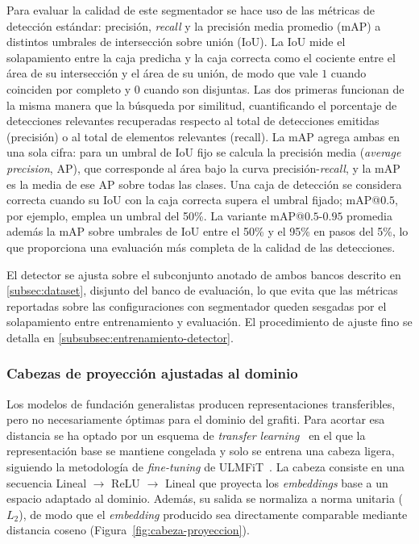 Para evaluar la calidad de este segmentador se hace uso de las métricas de
detección estándar: precisión, \textit{recall} y la precisión media promedio
(mAP) a distintos umbrales de intersección sobre unión (IoU). La IoU mide el
solapamiento entre la caja predicha y la caja correcta como el cociente entre
el área de su intersección y el área de su unión, de modo que vale $1$ cuando
coinciden por completo y $0$ cuando son disjuntas. Las dos primeras funcionan
de la misma manera que la búsqueda por similitud, cuantificando el porcentaje
de detecciones relevantes recuperadas respecto al total de detecciones emitidas
(precisión) o al total de elementos relevantes (recall). La mAP agrega ambas en
una sola cifra: para un umbral de IoU fijo se calcula la precisión media
(\textit{average precision}, AP), que corresponde al área bajo la curva
precisión-\textit{recall}, y la mAP es la media de ese AP sobre todas las
clases. Una caja de detección se considera correcta cuando su IoU con la caja
correcta supera el umbral fijado; mAP@$0.5$, por ejemplo, emplea un umbral del
50\%. La variante mAP@$0.5$-$0.95$ promedia además la mAP sobre umbrales de IoU
entre el 50\% y el 95\% en pasos del 5\%, lo que proporciona una evaluación más
completa de la calidad de las detecciones.

El detector se ajusta sobre el subconjunto anotado de ambos bancos descrito en
\ref{subsec:dataset}, disjunto del banco de evaluación, lo que evita que las
métricas reportadas sobre las configuraciones con segmentador queden sesgadas
por el solapamiento entre entrenamiento y evaluación. El procedimiento de ajuste
fino se detalla en \ref{subsubsec:entrenamiento-detector}.

\subsubsection{Cabezas de proyección ajustadas al dominio}
\label{subsubsec:cabezas}
Los modelos de fundación generalistas producen representaciones transferibles,
pero no necesariamente óptimas para el dominio del grafiti. Para acortar esa
distancia se ha optado por un esquema de \textit{transfer
learning}~\cite{pan_survey_2010} en el que la representación base se mantiene
congelada y solo se entrena una cabeza ligera, siguiendo la metodología de
\textit{fine-tuning} de ULMFiT~\cite{howard_universal_2018}. La cabeza consiste
en una secuencia Lineal $\rightarrow$ ReLU $\rightarrow$ Lineal que proyecta
los \textit{embeddings} base a un espacio adaptado al dominio. Además, su
salida se normaliza a norma unitaria ($L_2$), de modo que el \textit{embedding}
producido sea directamente comparable mediante distancia coseno
(Figura~\ref{fig:cabeza-proyeccion}).

